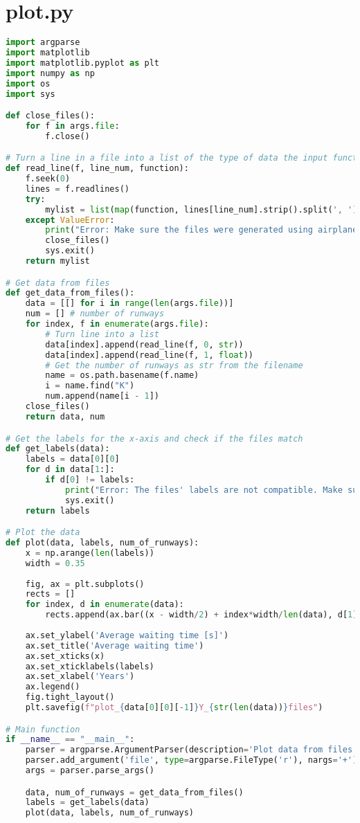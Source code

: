 \section{plot.py}

\begin{lstlisting}[language=Python, caption={plot.py}]
import argparse
import matplotlib
import matplotlib.pyplot as plt
import numpy as np
import os
import sys

def close_files():
    for f in args.file:
        f.close()

# Turn a line in a file into a list of the type of data the input function returns
def read_line(f, line_num, function):
    f.seek(0)
    lines = f.readlines()
    try:
        mylist = list(map(function, lines[line_num].strip().split(', ')))
    except ValueError:
        print("Error: Make sure the files were generated using airplanes.py.")
        close_files()
        sys.exit()
    return mylist

# Get data from files
def get_data_from_files():
    data = [[] for i in range(len(args.file))]
    num = [] # number of runways
    for index, f in enumerate(args.file):
        # Turn line into a list
        data[index].append(read_line(f, 0, str))
        data[index].append(read_line(f, 1, float))
        # Get the number of runways as str from the filename
        name = os.path.basename(f.name)
        i = name.find("K")
        num.append(name[i - 1])
    close_files()
    return data, num

# Get the labels for the x-axis and check if the files match
def get_labels(data):
    labels = data[0][0]
    for d in data[1:]:
        if d[0] != labels:
            print("Error: The files' labels are not compatible. Make sure the number of years in each file is the same.")
            sys.exit()
    return labels

# Plot the data
def plot(data, labels, num_of_runways):
    x = np.arange(len(labels))
    width = 0.35
    
    fig, ax = plt.subplots()
    rects = []
    for index, d in enumerate(data):
        rects.append(ax.bar((x - width/2) + index*width/len(data), d[1], width, label=(num_of_runways[index] + " runways")))
    
    ax.set_ylabel('Average waiting time [s]')
    ax.set_title('Average waiting time')
    ax.set_xticks(x)
    ax.set_xticklabels(labels)
    ax.set_xlabel('Years')
    ax.legend()
    fig.tight_layout()
    plt.savefig(f"plot_{data[0][0][-1]}Y_{str(len(data))}files")

# Main function
if __name__ == "__main__":
    parser = argparse.ArgumentParser(description='Plot data from files in a bar graph')
    parser.add_argument('file', type=argparse.FileType('r'), nargs='+')
    args = parser.parse_args()

    data, num_of_runways = get_data_from_files()
    labels = get_labels(data)
    plot(data, labels, num_of_runways)
\end{lstlisting}
